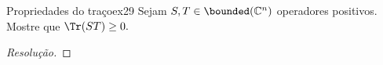 \begin{exercício}{Propriedades do traço}{ex29}
    Sejam \(S, T \in \bounded(\mathbb{C}^n)\) operadores positivos. Mostre que \(\Tr(ST) \geq 0.\)
\end{exercício}
\begin{proof}[Resolução]

\end{proof}
